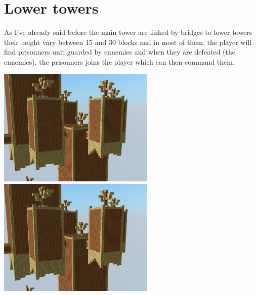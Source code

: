 \documentclass[article]{report}             %
\begin{document}
			\section{Lower towers}
				As I've already said before the main tower are linked by bridges to lower towers their height vary between 15 and 30 blocks and in most of them, the player will find prisonners unit guarded by ennemies and when they are defeated (the ennemies), the prisonners joins the player which can then command them.
				\begin{center}
					\includegraphics[width=7.5cm]{images/DT/mediumTowers.png}
					\includegraphics[width=7.5cm]{images/DT/mediumTowers.png} %
				\end{center}
\end{document}
